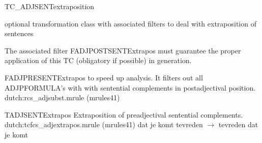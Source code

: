 \begin{mruleclass}{TC\_ADJSENTextraposition}
\begin{classdescr}
\kind optional transformation class with associated filters
\classtask to deal with extraposition of sentences
\classremarks

\begin{filters}
\item 
The associated filter FADJPOSTSENTExtrapos
must guarantee the proper application of this TC (obligatory
if possible) in generation. 


\end{filters}
\begin{speedrules}
\begin{member}
 FADJPRESENTExtrapos
 to speed up analysis. It filters out all ADJPFORMULA's
with with sentential complements in postadjectival position.
\file dutch:rcs\_adjsubst.mrule (mrules41)
\end{member}
\end{speedrules}

\noplannedrules

\norulesnotince

\end{classdescr}
\begin{members}
\begin{member}
 TADJSENTExtrapos
 Extraposition of preadjectival sentential complements.
\file dutch:tcfcs\_adjextrapos.mrule (mrules41)
\semantics \nosemantics
\example dat je komt tevreden $\rightarrow$ tevreden dat je komt
\remarks\mbox{}

\end{member}
\end{members}
\end{mruleclass}
